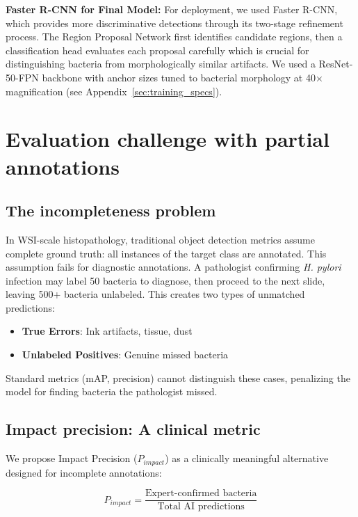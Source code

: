 \documentclass[sigconf, review, nonacm]{acmart}
\begin{document}
\noindent \textbf{Faster R-CNN for Final Model:}
For deployment, we used Faster R-CNN, which provides more discriminative detections through its two-stage refinement process. The Region Proposal Network first identifies candidate regions, then a classification head evaluates each proposal carefully which is crucial for distinguishing bacteria from morphologically similar artifacts. We used a ResNet-50-FPN backbone with anchor sizes tuned to bacterial morphology at 40× magnification (see Appendix~\ref{sec:training_specs}).

\section{Evaluation challenge with partial annotations}

\subsection{The incompleteness problem}

In WSI-scale histopathology, traditional object detection metrics assume complete ground truth: all instances of the target class are annotated. This assumption fails for diagnostic annotations. A pathologist confirming \textit{H. pylori} infection may label 50 bacteria to diagnose, then proceed to the next slide, leaving 500+ bacteria unlabeled. This creates two types of unmatched predictions:

\begin{itemize}[leftmargin=*]
    \item \textbf{True Errors}: Ink artifacts, tissue, dust
    \item \textbf{Unlabeled Positives}: Genuine missed bacteria
\end{itemize}

Standard metrics (mAP, precision) cannot distinguish these cases, penalizing the model for finding bacteria the pathologist missed.

\subsection{Impact precision: A clinical metric}

We propose Impact Precision ($P_{impact}$) as a clinically meaningful alternative designed for incomplete annotations:

\begin{equation}
P_{impact} = \frac{\text{Expert-confirmed bacteria}}{\text{Total AI predictions}}
\end{equation}
\end{document}
